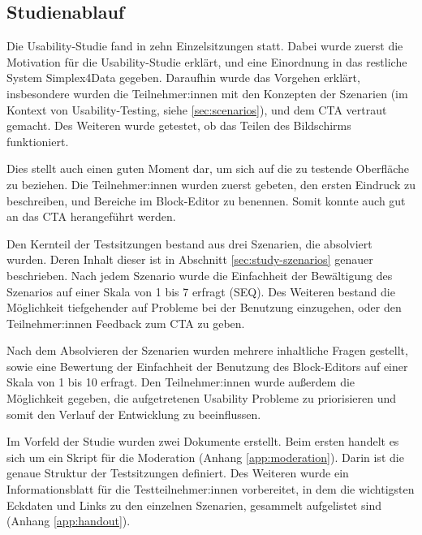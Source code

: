 \subsection{Studienablauf}

Die Usability-Studie fand in zehn Einzelsitzungen statt. Dabei wurde zuerst die Motivation für die Usability-Studie erklärt, und eine Einordnung in das restliche System Simplex4Data gegeben. Daraufhin wurde das Vorgehen erklärt, insbesondere wurden die Teilnehmer:innen mit den Konzepten der Szenarien (im Kontext von Usability-Testing, siehe \ref{sec:scenarios}), und dem \ac{CTA} vertraut gemacht. Des Weiteren wurde getestet, ob das Teilen des Bildschirms funktioniert.

Dies stellt auch einen guten Moment dar, um sich auf die zu testende Oberfläche zu beziehen. Die Teilnehmer:innen wurden zuerst gebeten, den ersten Eindruck zu beschreiben, und Bereiche im Block-Editor zu benennen. Somit konnte auch gut an das \ac{CTA} herangeführt werden.

Den Kernteil der Testsitzungen bestand aus drei Szenarien, die absolviert wurden. Deren Inhalt dieser ist in Abschnitt \ref{sec:study-szenarios} genauer beschrieben. Nach jedem Szenario wurde die Einfachheit der Bewältigung des Szenarios auf einer Skala von 1 bis 7 erfragt (\ac{SEQ}). Des Weiteren bestand die Möglichkeit tiefgehender auf Probleme bei der Benutzung einzugehen, oder den Teilnehmer:innen Feedback zum \ac{CTA} zu geben.

Nach dem Absolvieren der Szenarien wurden mehrere inhaltliche Fragen gestellt, sowie eine Bewertung der Einfachheit der Benutzung des Block-Editors auf einer Skala von 1 bis 10 erfragt. Den Teilnehmer:innen wurde außerdem die Möglichkeit gegeben, die aufgetretenen Usability Probleme zu priorisieren und somit den Verlauf der Entwicklung zu beeinflussen.

Im Vorfeld der Studie wurden zwei Dokumente erstellt. Beim ersten handelt es sich um ein Skript für die Moderation (Anhang \ref{app:moderation}). Darin ist die genaue Struktur der Testsitzungen definiert. Des Weiteren wurde ein Informationsblatt für die Testteilnehmer:innen vorbereitet, in dem die wichtigsten Eckdaten und Links zu den einzelnen Szenarien, gesammelt aufgelistet sind (Anhang \ref{app:handout}).
